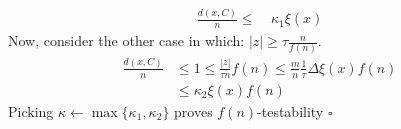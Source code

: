 \documentclass{article}
\begin{document}
\begin{multicols*}{2}
\begin{equation*}
\begin{split}
      \frac{d\left( x, C \right)}{n} \le & \  \kappa_{1} \xi\left( x \right)    
    \end{split}
  \end{equation*}
  Now, consider the other case in which: $ |z| \ge \tau \frac{n}{f\left( n \right)}  $.
  \begin{equation*}
    \begin{split}
      \frac{d\left( x, C \right)}{n} & \le 1 \le \frac{|z|}{\tau n}f\left( n \right) \le \frac{m}{n} \frac{1}{\tau} \Delta \xi\left( x\right)f\left( n \right) \\ & \le \kappa_{2} \xi\left( x \right)f\left( n \right)  
    \end{split}
  \end{equation*}
  Picking $ \kappa \leftarrow \max \{ \kappa_{1}, \kappa_{2} \}$ proves $f\left( n \right)$-testability $\square$
\end{multicols*}
\printbibliography 
\end{document}
